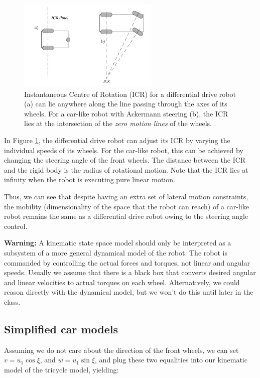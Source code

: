 \documentclass[twoside]{article}
\begin{document}
\begin{figure}[H]
\centering
\includegraphics[width=0.6\textwidth]{ICR}
\caption{Instantaneous Centre of Rotation (ICR) for a differential drive robot (a) can lie anywhere along the line passing through the axes of its wheels. For a car-like robot with Ackermann steering (b), the ICR lies at the intersection of the \textit{zero motion lines} of the wheels. }
\label{fig:ICR}
\end{figure}

In Figure \ref{fig:ICR}, the differential drive robot can adjust its ICR by varying the individual speeds of its wheels. For the car-like robot, this can be achieved by changing the steering angle of the front wheels. The distance between the ICR and the rigid body is the radius of rotational motion. Note that the ICR lies at infinity when the robot is executing pure linear motion. 

Thus, we can see that despite having an extra set of lateral motion constraints, the mobility (dimensionality of the space that the robot can reach) of a car-like robot remains the same as a differential drive robot owing to the steering angle control.


\textbf{Warning:} A kinematic state space model should only be interpreted as a subsystem of a more general dynamical model of the robot. The robot is commanded by controlling the actual forces and torques, not linear and angular speeds. Usually we assume that there is a black box that converts desired angular and linear velocities to actual torques on each wheel. Alternatively, we could reason directly with the dynamical model, but we won't do this until later in the class.



\subsection*{Simplified car models}

Assuming we do not care about the direction of the front wheels, we can set $v = u_1 \cos \xi$, and $w = u_1 \sin \xi$, and plug these two equalities into our kinematic model of the tricycle model, yielding:
\end{document}
